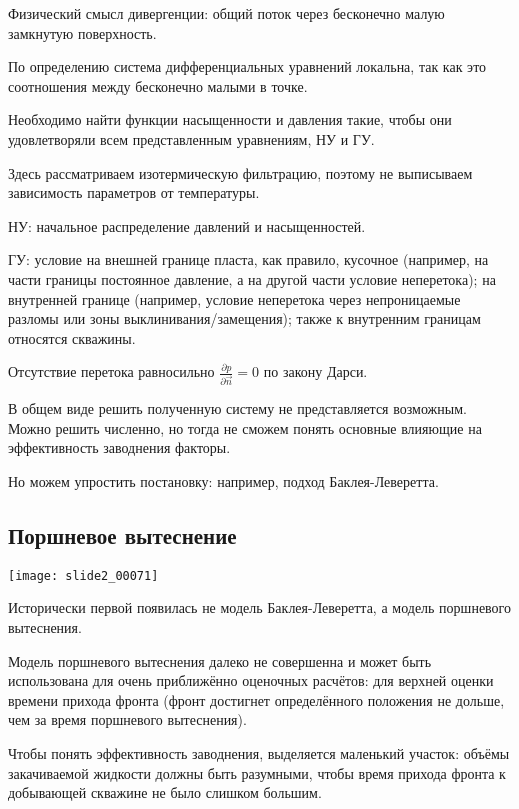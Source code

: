 \documentclass[main.tex]{subfiles}
\begin{document}
Физический смысл дивергенции: общий поток через бесконечно малую замкнутую поверхность.

По определению система дифференциальных уравнений локальна, так как это соотношения между бесконечно малыми в точке.

Необходимо найти функции насыщенности и давления такие, чтобы они удовлетворяли всем представленным уравнениям, НУ и ГУ.


Здесь рассматриваем изотермическую фильтрацию, поэтому не выписываем зависимость параметров от температуры.

НУ: начальное распределение давлений и насыщенностей.

ГУ: условие на внешней границе пласта, как правило, кусочное (например, на части границы постоянное давление, а на другой части условие неперетока); на внутренней границе (например, условие неперетока через непроницаемые разломы или зоны выклинивания/замещения); также к внутренним границам относятся скважины.

Отсутствие перетока равносильно $\displaystyle{}\frac{\partial p}{\partial \vec{n}}=0$ по закону Дарси.

В общем виде решить полученную систему не представляется возможным. Можно решить численно, но тогда не сможем понять основные влияющие на эффективность заводнения факторы.

Но можем упростить постановку: например, подход Баклея-Леверетта.

\subsection{Поршневое вытеснение}

\texttt{[image: slide2\_00071]}

Исторически первой появилась не модель Баклея-Леверетта, а модель поршневого вытеснения.

Модель поршневого вытеснения далеко не совершенна и может быть использована для очень приближённо оценочных расчётов: для верхней оценки времени прихода фронта (фронт достигнет определённого положения не дольше, чем за время поршневого вытеснения).

Чтобы понять эффективность заводнения, выделяется маленький участок: объёмы закачиваемой жидкости должны быть разумными, чтобы время прихода фронта к добывающей скважине не было слишком большим.

\end{document}
